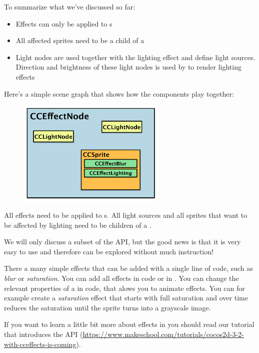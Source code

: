 To summarize what we've discussed so far: 
\begin{itemize}
  \item Effects can only be applied to
\ccsprite{}s
\item All affected sprites need to be a child of a
\item Light nodes are used together with the lighting
effect and define light sources. Direction and brightness of these light nodes
is used by \cocos{} to render lighting effects
\end{itemize}

Here's a simple scene graph that shows how the components play together:

\begin{figure}[H]
    \centering
    \includegraphics[width=200pt]{images/Chapter9/effect_setup.png}
\end{figure}

All effects need to be applied to \ccsprite{}s. All light sources and all
sprites that want to be affected by lighting need to be children of a
.

We will only discuss a subset of the  API, but the good
news is that it is very easy to use and therefore can be explored without much
instruction! 

There a many simple effects that can be added with a single line of
code, such as \textit{blur} or \textit{saturation}. You can add all effects in
code or in \SB{}. You can change the relevant
properties of a  in code, that
alows you to animate effects. You can for example create
a \textit{saturation} effect that starts with full
saturation and over time reduces the saturation until
the sprite turns into a grayscale image.

\begin{details}
If you want to learn a little bit more about effects in \cocos{} you should read
our tutorial that introduces the  
API (\url{https://www.makeschool.com/tutorials/cocos2d-3-2-with-cceffects-is-coming}).
\end{details}

